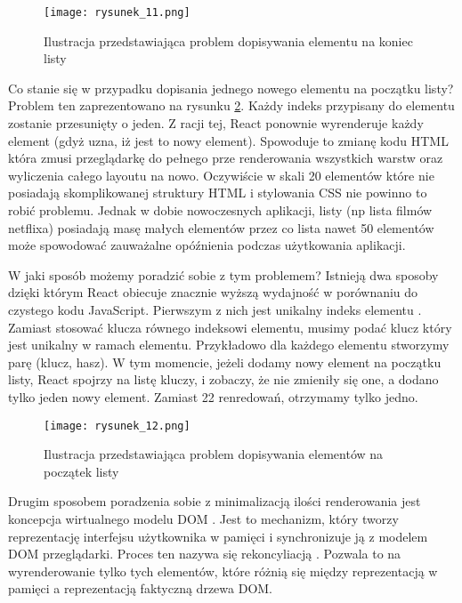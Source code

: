 \begin{figure}[htbp]
    \centering
    \texttt{[image: rysunek\_11.png]}
    \caption{Ilustracja przedstawiająca problem dopisywania elementu na koniec listy}
    \label{fig:rysunek_11}
\end{figure}

Co stanie się w przypadku dopisania jednego nowego elementu na początku listy? Problem ten zaprezentowano na rysunku \ref{fig:rysunek_12}. Każdy indeks przypisany do elementu zostanie przesunięty o jeden.
Z racji tej, React ponownie wyrenderuje każdy element (gdyż uzna, iż jest to nowy element). Spowoduje to zmianę kodu HTML która zmusi przeglądarkę do pełnego prze renderowania wszystkich warstw oraz wyliczenia całego layoutu na nowo.
Oczywiście w skali 20 elementów które nie posiadają skomplikowanej struktury HTML i stylowania CSS nie powinno to robić problemu.
Jednak w dobie nowoczesnych aplikacji, listy (np lista filmów netflixa) posiadają masę małych elementów przez co lista nawet 50 elementów może spowodować zauważalne opóźnienia podczas użytkowania aplikacji.

W jaki sposób możemy poradzić sobie z tym problemem? Istnieją dwa sposoby dzięki którym React obiecuje znacznie wyższą wydajność w porównaniu do czystego kodu JavaScript.
Pierwszym z nich jest unikalny indeks elementu \cite{react-lists}. Zamiast stosować klucza równego indeksowi elementu, musimy podać klucz który jest unikalny w ramach elementu.
Przykładowo dla każdego elementu stworzymy parę (klucz, hasz). W tym momencie, jeżeli dodamy nowy element na początku listy, React spojrzy na listę kluczy, i zobaczy, że nie zmieniły się one, a dodano tylko jeden nowy element.
Zamiast 22 renredowań, otrzymamy tylko jedno.

\begin{figure}[htbp]
    \centering
    \texttt{[image: rysunek\_12.png]}
    \caption{Ilustracja przedstawiająca problem dopisywania elementów na początek listy}
    \label{fig:rysunek_12}
\end{figure}

Drugim sposobem poradzenia sobie z minimalizacją ilości renderowania jest koncepcja wirtualnego modelu DOM \cite{virtualdom}.
Jest to mechanizm, który tworzy reprezentację interfejsu użytkownika w pamięci i synchronizuje ją z modelem DOM przeglądarki. Proces ten nazywa się rekoncyliacją \cite{reconcilation}.
Pozwala to na wyrenderowanie tylko tych elementów, które różnią się między reprezentacją w pamięci a reprezentacją faktyczną drzewa DOM.


